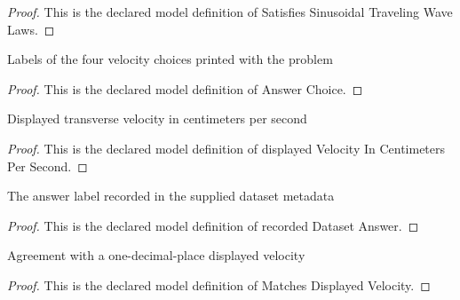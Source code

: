 \begin{proof}
  This is the declared model definition of Satisfies Sinusoidal Traveling Wave Laws.
\end{proof}
\begin{definition}
  \label{def:physics:phyx-mini-0290:phyxminiproblems-problemphyxmini0290-answerchoice}
  Labels of the four velocity choices printed with the problem
\end{definition}
\begin{proof}
  This is the declared model definition of Answer Choice.
\end{proof}
\begin{definition}
  \label{def:physics:phyx-mini-0290:phyxminiproblems-problemphyxmini0290-displayedvelocityincentimeterspersecond}
  Displayed transverse velocity in centimeters per second
\end{definition}
\begin{proof}
  This is the declared model definition of displayed Velocity In Centimeters Per Second.
\end{proof}
\begin{definition}
  \label{def:physics:phyx-mini-0290:phyxminiproblems-problemphyxmini0290-recordeddatasetanswer}
  The answer label recorded in the supplied dataset metadata
\end{definition}
\begin{proof}
  This is the declared model definition of recorded Dataset Answer.
\end{proof}
\begin{definition}
  \label{def:physics:phyx-mini-0290:phyxminiproblems-problemphyxmini0290-matchesdisplayedvelocity}
  Agreement with a one-decimal-place displayed velocity
\end{definition}
\begin{proof}
  This is the declared model definition of Matches Displayed Velocity.
\end{proof}
